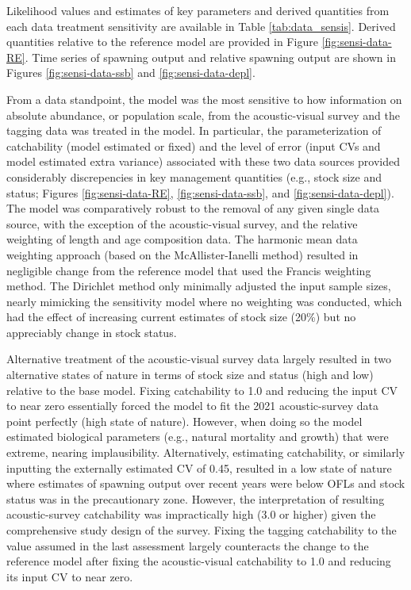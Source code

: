 \documentclass[11pt,
  english,
  letterpaper,
]{article}
\begin{document}
Likelihood values and estimates of key parameters and derived quantities from each data treatment sensitivity are available in Table \ref{tab:data_sensis}. Derived quantities relative to the reference model are provided in Figure \ref{fig:sensi-data-RE}. Time series of spawning output and relative spawning output are shown in Figures \ref{fig:sensi-data-ssb} and \ref{fig:sensi-data-depl}.

From a data standpoint, the model was the most sensitive to how information on absolute abundance, or population scale, from the acoustic-visual survey and the tagging data was treated in the model. In particular, the parameterization of catchability (model estimated or fixed) and the level of error (input CVs and model estimated extra variance) associated with these two data sources provided considerably discrepencies in key management quantities (e.g., stock size and status; Figures \ref{fig:sensi-data-RE}, \ref{fig:sensi-data-ssb}, and \ref{fig:sensi-data-depl}). The model was comparatively robust to the removal of any given single data source, with the exception of the acoustic-visual survey, and the relative weighting of length and age composition data. The harmonic mean data weighting approach (based on the McAllister-Ianelli method) resulted in negligible change from the reference model that used the Francis weighting method. The Dirichlet method only minimally adjusted the input sample sizes, nearly mimicking the sensitivity model where no weighting was conducted, which had the effect of increasing current estimates of stock size (20\%) but no appreciably change in stock status.

Alternative treatment of the acoustic-visual survey data largely resulted in two alternative states of nature in terms of stock size and status (high and low) relative to the base model. Fixing catchability to 1.0 and reducing the input CV to near zero essentially forced the model to fit the 2021 acoustic-survey data point perfectly (high state of nature). However, when doing so the model estimated biological parameters (e.g., natural mortality and growth) that were extreme, nearing implausibility. Alternatively, estimating catchability, or similarly inputting the externally estimated CV of 0.45, resulted in a low state of nature where estimates of spawning output over recent years were below OFLs and stock status was in the precautionary zone. However, the interpretation of resulting acoustic-survey catchability was impractically high (3.0 or higher) given the comprehensive study design of the survey. Fixing the tagging catchability to the value assumed in the last assessment largely counteracts the change to the reference model after fixing the acoustic-visual catchability to 1.0 and reducing its input CV to near zero.
\end{document}
